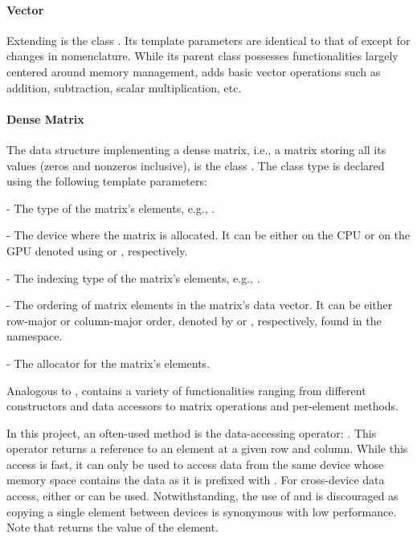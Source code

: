 \paragraph{Vector} Extending  is the  class \cite{ixA8ZYptYohwlgwt}.
Its template parameters are identical to that of  except for changes in nomenclature.
While its parent class possesses functionalities largely centered around memory management,  adds basic vector operations such as addition, subtraction, scalar multiplication, etc.

\paragraph{Dense Matrix} The data structure implementing a dense matrix, i.e., a matrix storing all its values (zeros and nonzeros inclusive), is the  class \cite{ixA8ZYptYohwlgwt}.
The class type is declared using the following template parameters:

\begin{tight_itemize}
	\item {} - The type of the matrix's elements, e.g., .
	\item {} - The device where the matrix is allocated.
It can be either on the CPU or on the GPU denoted using  or , respectively.
	\item {} - The indexing type of the matrix's elements, e.g., .
	\item {} - The ordering of matrix elements in the matrix's data vector.
It can be either row-major or column-major order, denoted by  or , respectively, found in the  namespace.
	\item {} - The allocator for the matrix's elements.
\end{tight_itemize}

Analogous to ,  contains a variety of functionalities ranging from different constructors and data accessors to matrix operations and per-element methods.

In this project, an often-used method is the data-accessing operator: .
This operator returns a reference to an element at a given row and column.
While this access is fast, it can only be used to access data from the same device whose memory space contains the data as it is prefixed with .
For cross-device data access, either  or  can be used.
Notwithstanding, the use of  and  is discouraged as copying a single element between devices is synonymous with low performance.
Note that  returns the value of the element.


